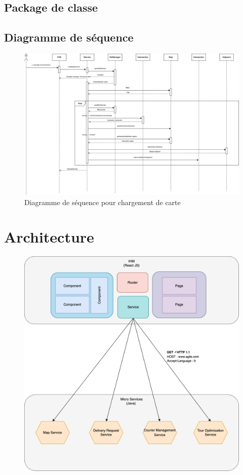 \documentclass[a4paper]{article}
\begin{document}
\subsection{Package de classe}

\subsection{Diagramme de séquence}

\begin{figure}[H]
    \centering
    \includegraphics[width=1.15\linewidth, angle=270]{images/sequence-loadmap.png}
    \caption{Diagramme de séquence pour chargement de carte}
\end{figure}


\section{Architecture}

\begin{figure}[H]
    \centering
    \includegraphics[width=0.75\linewidth]{images/archi.png}
\end{figure}
\end{document}
